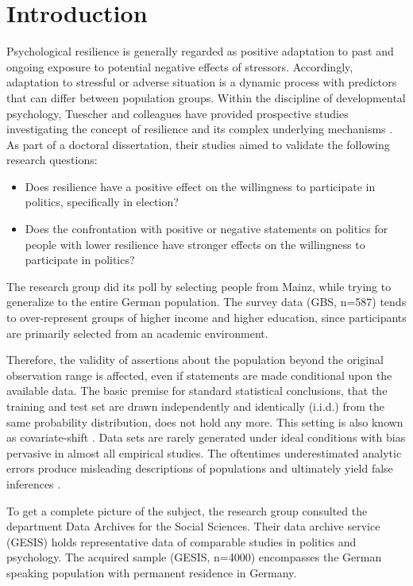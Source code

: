 \chapter{Introduction}

Psychological resilience is generally regarded as positive adaptation to past and ongoing exposure to potential negative effects of stressors. Accordingly, adaptation to stressful or adverse situation is a dynamic process with predictors that can differ between population groups. Within the discipline of developmental psychology, Tuescher and colleagues have provided prospective studies investigating the concept of resilience and its complex underlying mechanisms \cite{tuscher}. As part of a doctoral dissertation, their studies aimed to validate the following research questions:

\begin{itemize}
    \item Does resilience have a positive effect on the willingness to participate in politics, specifically in election?
    \item Does the confrontation with positive or negative statements on politics for people with lower resilience have stronger effects on the willingness to participate in politics?
\end{itemize}

The research group did its poll by selecting people from Mainz, while trying to generalize to the entire German population. The survey data (GBS, n=587) tends to over-represent groups of higher income and higher education, since participants are primarily selected from an academic environment.

Therefore, the validity of assertions about the population beyond the original observation range is affected, even if statements are made conditional upon the available data. The basic premise for standard statistical conclusions, that the training and test set are drawn independently and identically (i.i.d.) from the same probability distribution, does not hold any more. This setting is also known as covariate-shift \cite{candela}. Data sets are rarely generated under ideal conditions with bias pervasive in almost all empirical studies. The oftentimes underestimated analytic errors produce misleading descriptions of populations and ultimately yield false inferences \cite{west}.

To get a complete picture of the subject, the research group consulted the department Data Archives for the Social Sciences. Their data archive service (GESIS) holds representative data of comparable studies in politics and psychology. The acquired sample (GESIS, n=4000) encompasses the German speaking population with permanent residence in Germany. 

